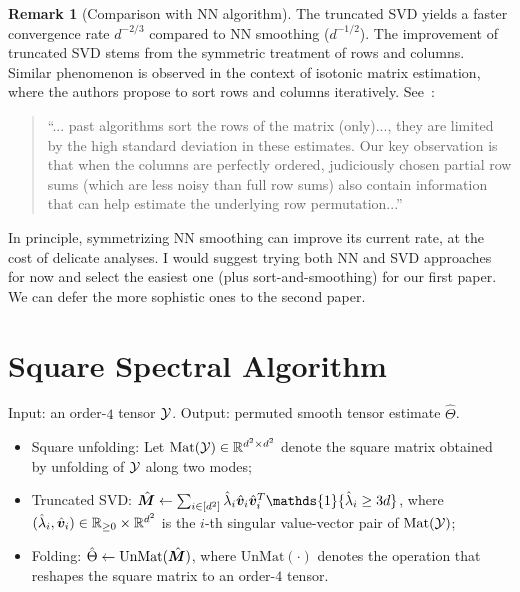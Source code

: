 \documentclass[10pt]{article}
\theoremstyle{definition}
\theoremstyle{definition}
\newtheorem{rmk}{Remark}
\theoremstyle{definition}
\begin{document}
\begin{rmk}[Comparison with NN algorithm] The truncated SVD yields a faster convergence rate $d^{-2/3}$ compared to NN smoothing ($d^{-1/2}$). The improvement of truncated SVD stems from the symmetric treatment of rows and columns. Similar phenomenon is observed in the context of isotonic matrix estimation, where the authors propose to sort rows and columns iteratively. See~\cite{mao2018towards}:
\begin{quote}``... past algorithms sort the rows of the matrix (only)..., they are limited by the high standard deviation in these estimates. Our key observation is that when the columns are perfectly ordered, judiciously chosen partial row sums (which are less noisy than full row sums) also contain information that can help estimate the underlying row permutation...''
\end{quote}

In principle, symmetrizing NN smoothing can improve its current rate, at the cost of delicate analyses. %
I would suggest trying both NN and SVD approaches for now and select the easiest one (plus sort-and-smoothing) for our first paper. We can defer the more sophistic ones to the second paper. 
\end{rmk}

\section{Square Spectral Algorithm}
Input: an order-$4$ tensor $\mathcal{Y}$. Output: permuted smooth tensor estimate $\hat \Theta$. 
\begin{itemize}
\item Square unfolding: Let $\text{Mat}(\mathcal{Y})\in\mathbb{R}^{d^2\times d^2}$ denote the square matrix obtained by unfolding of $\mathcal{Y}$ along two modes;
\item Truncated SVD: $\hat \mM \leftarrow \sum_{i\in[d^2]} \hat \lambda_i \hat \mv_i\hat \mv^T_i\mathds{1}\{\hat \lambda_i\geq 3d\}$, where $(\hat \lambda_i, \hat {\bm{v}}_i)\in\mathbb{R}_{\geq 0}\times\mathbb{R}^{d^2}$ is the $i$-th singular value-vector pair of $\text{Mat}(\mathcal{Y})$;
\item Folding: $\hat \Theta\leftarrow \text{UnMat}(\hat {\bm M})$, where $\text{UnMat}(\cdot)$ denotes the operation that reshapes the square matrix to an order-$4$ tensor. 
\end{itemize}
\end{document}
